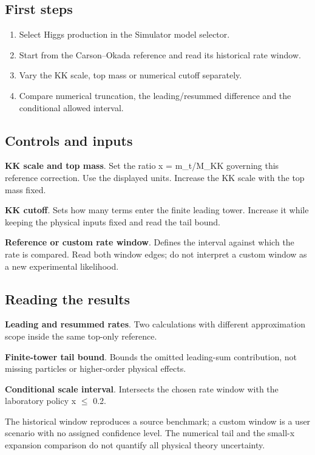 \documentclass[11pt,a4paper]{article}
\begin{document}
\subsection*{First steps}
\begin{enumerate}
\item Select Higgs production in the Simulator model selector.
\item Start from the Carson--Okada reference and read its historical rate window.
\item Vary the KK scale, top mass or numerical cutoff separately.
\item Compare numerical truncation, the leading/resummed difference and the conditional allowed interval.
\end{enumerate}
\subsection*{Controls and inputs}
\textbf{KK scale and top mass}. Set the ratio x = m\_t/M\_KK governing this reference correction. Use the displayed units. Increase the KK scale with the top mass fixed.

\textbf{KK cutoff}. Sets how many terms enter the finite leading tower. Increase it while keeping the physical inputs fixed and read the tail bound.

\textbf{Reference or custom rate window}. Defines the interval against which the rate is compared. Read both window edges; do not interpret a custom window as a new experimental likelihood.

\subsection*{Reading the results}
\textbf{Leading and resummed rates}. Two calculations with different approximation scope inside the same top-only reference.

\textbf{Finite-tower tail bound}. Bounds the omitted leading-sum contribution, not missing particles or higher-order physical effects.

\textbf{Conditional scale interval}. Intersects the chosen rate window with the laboratory policy x \ensuremath{\leq} 0.2.

The historical window reproduces a source benchmark; a custom window is a user scenario with no assigned confidence level. The numerical tail and the small-x expansion comparison do not quantify all physical theory uncertainty.
\end{document}
